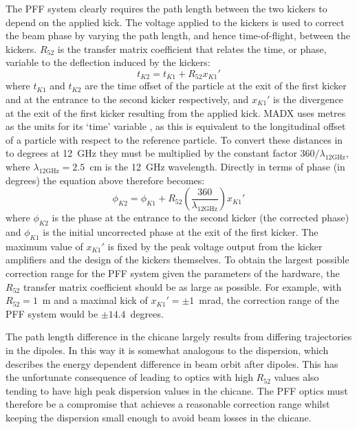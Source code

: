 The PFF system clearly requires the path length between the two kickers to depend on the applied kick.  
The voltage applied to the kickers is used to correct the beam phase by varying the path length, and hence time-of-flight, between the kickers. \(R_{52}\) is the transfer matrix coefficient that relates the time, or phase, variable to the deflection induced by the kickers:
\begin{equation}
t_{K2} = t_{K1} + R_{52}x_{K1}'
\end{equation}
where \(t_{K1}\) and \(t_{K2}\) are the time offset of the particle at the exit of the first kicker and at the entrance to the second kicker respectively, and \(x_{K1}'\) is the divergence at the exit of the first kicker resulting from the applied kick. MADX uses metres as the units for its `time' variable \cite{madx}, as this is equivalent to the longitudinal offset of a particle with respect to the reference particle. To convert these distances in to degrees at 12~GHz they must be multiplied by the constant factor \(360/\lambda_{\mathrm{12GHz}}\), where \(\lambda_{\mathrm{12GHz}} = 2.5\)~cm is the 12~GHz wavelength. Directly in terms of phase (in degrees) the equation above therefore becomes:
\begin{equation}
\phi_{K2} = \phi_{K1} + R_{52}\left(\frac{360}{\lambda_{\mathrm{12GHz}}}\right)x_{K1}'
\end{equation}
where \(\phi_{K2}\) is the phase at the entrance to the second kicker (the corrected phase) and \(\phi_{K1}\) is the initial uncorrected phase at the exit of the first kicker. The maximum value of \(x_{K1}'\) is fixed by the peak voltage output from the kicker amplifiers and the design of the kickers themselves. To obtain the largest possible correction range for the PFF system given the parameters of the hardware, the \(R_{52}\) transfer matrix coefficient should be as large as possible. For example, with \(R_{52} = 1\)~m and a maximal kick of \(x_{K1}' = \pm 1\)~mrad, the correction range of the PFF system would be \(\pm 14.4\)~degrees.

The path length difference in the chicane largely results from differing trajectories in the dipoles. In this way it is somewhat analogous to the dispersion, which describes the energy dependent difference in beam orbit after dipoles. This has the unfortunate consequence of leading to optics with high \(R_{52}\) values also tending to have high peak dispersion values in the chicane. The PFF optics must therefore be a compromise that achieves a reasonable correction range whilst keeping the dispersion small enough to avoid beam losses in the chicane.

